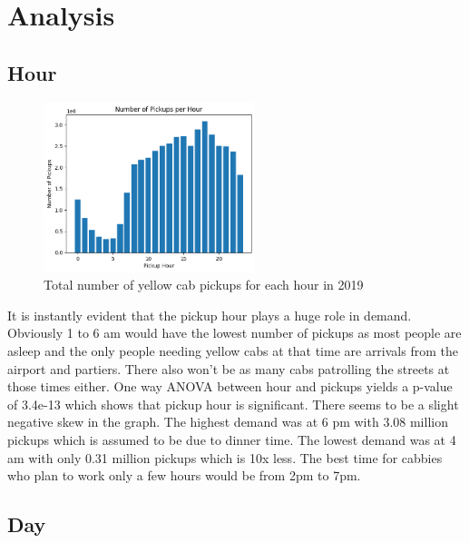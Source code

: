 \documentclass[11pt]{article}
\begin{document}
\section{Analysis}

\subsection{Hour}

\begin{figure}[h]
    \includegraphics[width=0.55\textwidth]{plots/hour.png}
    \centering
    \caption{Total number of yellow cab pickups for each hour in 2019} %
\end{figure}

It is instantly evident that the pickup hour plays a huge role in demand. Obviously 1 to 6 am would have the lowest number of pickups as most people are asleep and the only people needing yellow cabs at that time are arrivals from the airport and partiers. There also won’t be as many cabs patrolling the streets at those times either. One way ANOVA between hour and pickups yields a p-value of 3.4e-13 which shows that pickup hour is significant. There seems to be a slight negative skew in the graph. The highest demand was at 6 pm with 3.08 million pickups which is assumed to be due to dinner time. The lowest demand was at 4 am with only 0.31 million pickups which is 10x less. The best time for cabbies who plan to work only a few hours would be from 2pm to 7pm.

\subsection{Day}
\end{document}
